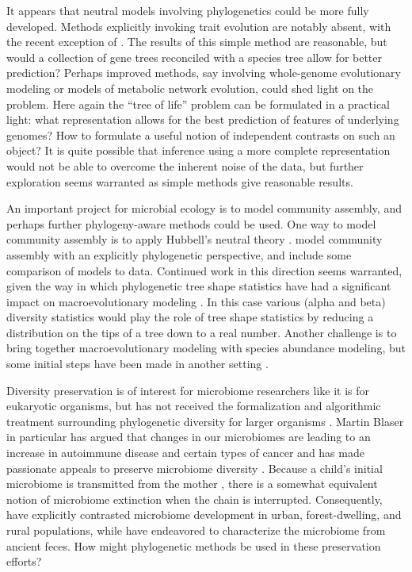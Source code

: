 \documentclass{amsart}
\begin{document}
It appears that neutral models involving phylogenetics could be more fully developed.
Methods explicitly invoking trait evolution are notably absent, with the recent exception of \citep{langille2013predictive}.
The results of this simple method are reasonable, but would a collection of gene trees reconciled with a species tree allow for better prediction?
Perhaps improved methods, say involving whole-genome evolutionary modeling or models of metabolic network evolution, could shed light on the problem.
Here again the ``tree of life'' problem can be formulated in a practical light: what representation allows for the best prediction of features of underlying genomes?
How to formulate a useful notion of independent contrasts \citep{felsenstein1985phylogenies} on such an object?
It is quite possible that inference using a more complete representation would not be able to overcome the inherent noise of the data, but further exploration seems warranted as simple methods give reasonable results.

An important project for microbial ecology is to model community assembly, and perhaps further phylogeny-aware methods could be used.
One way to model community assembly is to apply Hubbell's neutral theory \citep{fierer2012animalcules,costello2012application}.
\citet{o2012phylogenetic} model community assembly with an explicitly phylogenetic perspective, and include some comparison of models to data.
Continued work in this direction seems warranted, given the way in which phylogenetic tree shape statistics have had a significant impact on macroevolutionary modeling \citep{mooers1997inferring,aldous2011five}.
In this case various (alpha and beta) diversity statistics would play the role of tree shape statistics by reducing a distribution on the tips of a tree down to a real number.
Another challenge is to bring together macroevolutionary modeling with species abundance modeling, but some initial steps have been made in another setting \citep{lambert2013predicting}.

Diversity preservation is of interest for microbiome researchers like it is for eukaryotic organisms, but has not received the formalization and algorithmic treatment surrounding phylogenetic diversity for larger organisms \citep{hartmann2006maximizing,pardi2007resource}.
Martin Blaser in particular has argued that changes in our microbiomes are leading to an increase in autoimmune disease and certain types of cancer \citep[reviewed in][]{cho2012human} and has made passionate appeals to preserve microbiome diversity \citep{blaser2011antibiotic}.
Because a child's initial microbiome is transmitted from the mother \citep[reviewed in][]{funkhouser2013mom}, there is a somewhat equivalent notion of microbiome extinction when the chain is interrupted.
Consequently, \citet{yatsunenko2012human} have explicitly contrasted microbiome development in urban, forest-dwelling, and rural populations, while \citet{tito2012insights} have endeavored to characterize the microbiome from ancient feces.
How might phylogenetic methods be used in these preservation efforts?
\end{document}
